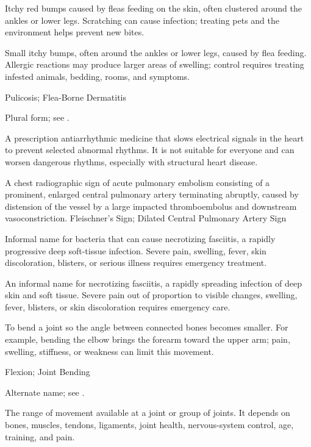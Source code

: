  Itchy red bumps caused by fleas feeding on the skin, often clustered around the ankles or lower legs. Scratching can cause infection; treating pets and the environment helps prevent new bites.

 Small itchy bumps, often around the ankles or lower legs, caused by flea feeding. Allergic reactions may produce larger areas of swelling; control requires treating infested animals, bedding, rooms, and symptoms.

\synonyms
Pulicosis; Flea-Borne Dermatitis

 Plural form; see .

 A prescription antiarrhythmic medicine that slows electrical signals in the heart to prevent selected abnormal rhythms. It is not suitable for everyone and can worsen dangerous rhythms, especially with structural heart disease.

 A chest radiographic sign of acute pulmonary embolism consisting of a prominent, enlarged central pulmonary artery terminating abruptly, caused by distension of the vessel by a large impacted thromboembolus and downstream vasoconstriction.
\synonyms
Fleischner's Sign; Dilated Central Pulmonary Artery Sign

 Informal name for bacteria that can cause necrotizing fasciitis, a rapidly progressive deep soft-tissue infection. Severe pain, swelling, fever, skin discoloration, blisters, or serious illness requires emergency treatment.

 An informal name for necrotizing fasciitis, a rapidly spreading infection of deep skin and soft tissue. Severe pain out of proportion to visible changes, swelling, fever, blisters, or skin discoloration requires emergency care.

 To bend a joint so the angle between connected bones becomes smaller. For example, bending the elbow brings the forearm toward the upper arm; pain, swelling, stiffness, or weakness can limit this movement.

\synonyms
Flexion; Joint Bending

 Alternate name; see .

 The range of movement available at a joint or group of joints. It depends on bones, muscles, tendons, ligaments, joint health, nervous-system control, age, training, and pain.

